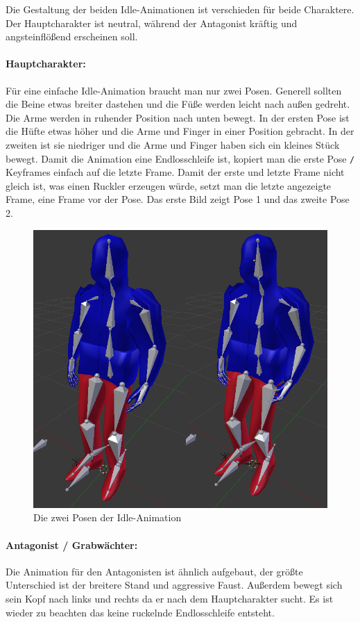 Die Gestaltung der beiden Idle-Animationen ist verschieden für beide Charaktere. Der Hauptcharakter ist neutral, während der Antagonist kräftig und angsteinflößend erscheinen soll.

\paragraph{Hauptcharakter:}
Für eine einfache Idle-Animation braucht man nur zwei Posen. Generell sollten die Beine etwas breiter dastehen und die Füße werden leicht nach außen gedreht.
Die Arme werden in ruhender Position nach unten bewegt. In der ersten Pose ist die Hüfte etwas höher und die Arme und Finger in einer Position gebracht.
In der zweiten ist sie niedriger und die Arme und Finger haben sich ein kleines Stück bewegt. Damit die Animation eine Endlosschleife ist, kopiert man die erste Pose \verb-/-
Keyframes einfach auf die letzte Frame. Damit der erste und letzte Frame nicht gleich ist,
was einen Ruckler erzeugen würde, setzt man die letzte angezeigte Frame, eine Frame vor der Pose. Das erste Bild zeigt Pose 1 und das zweite Pose 2.

\begin{figure}[H]
    \centering

    \includegraphics[width=.8\textwidth]{images/animation_idle.png}
    \caption{Die zwei Posen der Idle-Animation}
\end{figure}

\paragraph{Antagonist / Grabwächter:}
Die Animation für den Antagonisten ist ähnlich aufgebaut, der größte Unterschied ist der breitere Stand und aggressive Faust.
Außerdem bewegt sich sein Kopf nach links und rechts da er nach dem Hauptcharakter sucht. Es ist wieder zu beachten das keine ruckelnde Endlosschleife entsteht.

